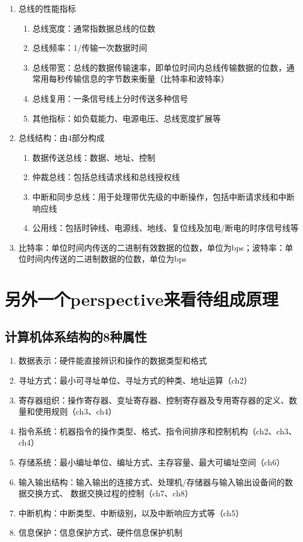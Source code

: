 \documentclass[]{report}
\begin{document}
\begin{enumerate}
		\item 总线的性能指标
		\begin{enumerate}
			\item 总线宽度：通常指数据总线的位数
			\item 总线频率：1/传输一次数据时间
			\item 总线带宽：总线的数据传输速率，即单位时间内总线传输数据的位数，通常用每秒传输信息的字节数来衡量（比特率和波特率）
			\item 总线复用：一条信号线上分时传送多种信号
			\item 其他指标：如负载能力、电源电压、总线宽度扩展等
		\end{enumerate}
		\item 总线结构：由4部分构成
		\begin{enumerate}
			\item 数据传送总线：数据、地址、控制
			\item 仲裁总线：包括总线请求线和总线授权线
			\item 中断和同步总线：用于处理带优先级的中断操作，包括中断请求线和中断响应线
			\item 公用线：包括时钟线、电源线、地线、复位线及加电/断电的时序信号线等
		\end{enumerate}
		\item 比特率：单位时间内传送的二进制有效数据的位数，单位为bps；波特率：单位时间内传送的二进制数据的位数，单位为bps
	\end{enumerate}


	\section{另外一个perspective来看待组成原理}
	\subsection{计算机体系结构的8种属性}
		\begin{enumerate}
			\item 数据表示：硬件能直接辨识和操作的数据类型和格式
			\item 寻址方式：最小可寻址单位、寻址方式的种类、地址运算（ch2）
			\item 寄存器组织：操作寄存器、变址寄存器、控制寄存器及专用寄存器的定义、数量和使用规则（ch3、ch4）
			\item 指令系统：机器指令的操作类型、格式、指令间排序和控制机构（ch2、ch3、ch4）
			\item 存储系统：最小编址单位、编址方式、主存容量、最大可编址空间（ch6）
			\item 输入输出结构：输入输出的连接方式、处理机/存储器与输入输出设备间的数据交换方式、 数据交换过程的控制（ch7、ch8）
			\item 中断机构：中断类型、中断级别，以及中断响应方式等（ch5）
			\item 信息保护：信息保护方式、硬件信息保护机制
		\end{enumerate}\par
\end{document}
